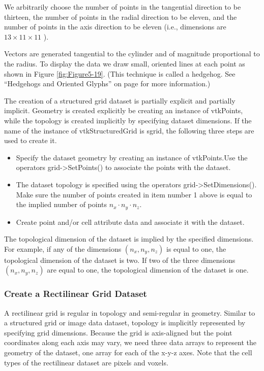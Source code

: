 We arbitrarily choose the number of points in the tangential direction to be thirteen, the number of points in the radial direction to be eleven, and the number of points in the axis direction to be eleven (i.e., dimensions are $13 \times 11 \times 11$ ).

Vectors are generated tangential to the cylinder and of magnitude proportional to the radius. To display the data we draw small, oriented lines at each point as shown in Figure \ref{fig:Figure5-19}. (This technique is called a hedgehog. See ``Hedgehogs and Oriented Glyphs'' on page \pageref{subsec:hedgehogs_oriented_glyphs} for more information.)

The creation of a structured grid dataset is partially explicit and partially implicit. Geometry is created explicitly be creating an instance of vtkPoints, while the topology is created implicitly by specifying dataset dimensions. If the name of the instance of vtkStructuredGrid is sgrid, the following three steps are used to create it.

\begin{itemize}

	\item Specify the dataset geometry by creating an instance of vtkPoints.Use the operators grid->SetPoints() to associate the points with the dataset.

	\item The dataset topology is specified using the operators grid->SetDimensions(). Make sure the number of points created in item number 1 above is equal to the implied number of points $n_x⋅n_y⋅n_z$.

	\item Create point and/or cell attribute data and associate it with the dataset.

\end{itemize}

The topological dimension of the dataset is implied by the specified dimensions. For example, if any of the dimensions $(n_x, n_y, n_z)$ is equal to one, the topological dimension of the dataset is two. If two of the three dimensions $(n_x, n_y, n_z)$ are equal to one, the topological dimension of the dataset is one.

\subsubsection{Create a Rectilinear Grid Dataset}

A rectilinear grid is regular in topology and semi-regular in geometry. Similar to a structured grid or image data dataset, topology is implicitly represented by specifying grid dimensions. Because the grid is axis-aligned but the point coordinates along each axis may vary, we need three data arrays to represent the geometry of the dataset, one array for each of the x-y-z axes. Note that the cell types of the rectilinear dataset are pixels and voxels.

